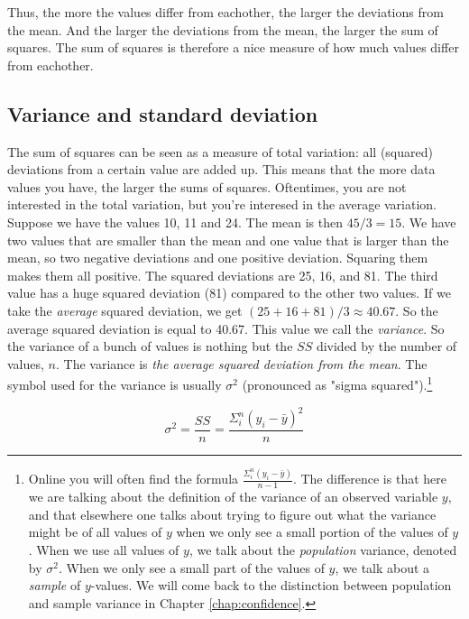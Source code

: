 \documentclass[]{book}\usepackage[]{graphicx}\usepackage[]{color}
\begin{document}
Thus, the more the values differ from eachother, the larger the deviations from the mean. And the larger the deviations from the mean, the larger the sum of squares. The sum of squares is therefore a nice measure of how much values differ from eachother.

\subsection{Variance and standard deviation} \label{sec:standarddeviation}

The sum of squares can be seen as a measure of total variation: all (squared) deviations from a certain value are added up. This means that the more data values you have, the larger the sums of squares. Oftentimes, you are not interested in the total variation, but you're interesed in the average variation. Suppose we have the values 10, 11 and 24. The mean is then $45/3=15$. We have two values that are smaller than the mean and one value that is larger than the mean, so two negative deviations and one positive deviation. Squaring them makes them all positive. The squared deviations are 25, 16, and 81. The third value has a huge squared deviation (81) compared to the other two values. If we take the \textit{average} squared deviation, we get $(25+16+81)/3 \approx 40.67$. So the average squared deviation is equal to 40.67. This value we call the \textit{variance}. So the variance of a bunch of values is nothing but the $SS$ divided by the number of values, $n$. The variance is \textit{the average squared deviation from the mean}. The symbol used for the variance is usually $\sigma^2$ (pronounced as "sigma squared").\footnote{Online you will often find the formula $\frac{\Sigma_i^n (y_i-\bar{y})}{n-1}$. The difference is that here we are talking about the definition of the variance of an observed variable $y$, and that elsewhere one talks about trying to figure out what the variance might be of all values of $y$ when we only see a small portion of the values of $y$. When we use all values of $y$, we talk about the \textit{population} variance, denoted by $\sigma^2$. When we only see a small part of the values of $y$, we talk about a \textit{sample} of $y$-values. We will come back to the distinction between population and sample variance in Chapter \ref{chap:confidence}.}

\begin{equation}
\sigma^2 = \frac{SS}{n}= \frac{\Sigma_i^n (y_i-\bar{y})^2}{n}
\end{equation}
\end{document}

